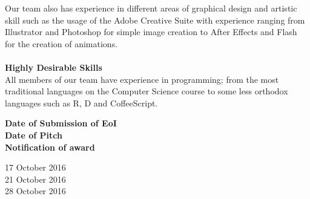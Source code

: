 \documentclass[11pt, oneside]{article}
\begin{document}
Our team also has experience in different areas of graphical design and artistic skill such as the usage of the Adobe Creative Suite with experience ranging from Illustrator and Photoshop for simple image creation to After Effects and Flash for the creation of animations.\\ \\
\textbf{Highly Desirable Skills}\\
All members of our team have experience in programming; from the most traditional languages on the Computer Science course to some less orthodox languages such as R, D and CoffeeScript.\\

\begin{minipage}[t]{0.5\textwidth}
    \textbf{Date of Submission of EoI}\\
    \textbf{Date of Pitch}\\
    \textbf{Notification of award}\\

\end{minipage}
\begin{minipage}[t]{0.5\textwidth}
    17 October 2016\\
    21 October 2016\\
    28 October 2016\\
\end{minipage}
\end{document}
